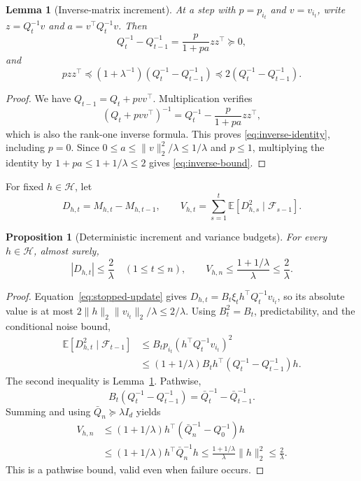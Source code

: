 \documentclass[11pt,a4paper]{article}
\numberwithin{equation}{section}
\newtheorem{lemma}[theorem]{Lemma}
\newtheorem{proposition}[theorem]{Proposition}
\theoremstyle{remark}
\newcommand{\E}{\mathbb E}
\newcommand{\F}{\mathcal F}
\newcommand{\HH}{\mathcal H}
\begin{document}
\begin{lemma}[Inverse-matrix increment]
\label{lem:inverse}
At a step with $p=p_{i_t}$ and $v=v_{i_t}$, write
$z=Q_t^{-1}v$ and $a=v^\top Q_t^{-1}v$. Then
\begin{equation}\label{eq:inverse-identity}
 Q_t^{-1}-Q_{t-1}^{-1}=\frac{p}{1+pa}zz^\top\succeq0,
\end{equation}
and
\begin{equation}\label{eq:inverse-bound}
 pzz^\top\preceq(1+\lambda^{-1})
       (Q_t^{-1}-Q_{t-1}^{-1})
 \preceq2(Q_t^{-1}-Q_{t-1}^{-1}).
\end{equation}
\end{lemma}
\begin{proof}
We have $Q_{t-1}=Q_t+pvv^\top$. Multiplication verifies
\[
 (Q_t+pvv^\top)^{-1}
 =Q_t^{-1}-\frac{p}{1+pa}zz^\top,
\]
which is also the rank-one inverse formula. This proves
\eqref{eq:inverse-identity}, including $p=0$. Since
$0\le a\le\|v\|_2^2/\lambda\le1/\lambda$ and $p\le1$, multiplying
the identity by $1+pa\le1+1/\lambda\le2$ gives
\eqref{eq:inverse-bound}.
\end{proof}

For fixed $h\in\HH$, let
\begin{equation}\label{eq:scalar-variance}
 D_{h,t}=M_{h,t}-M_{h,t-1},\qquad
 V_{h,t}=\sum_{s=1}^t\E[D_{h,s}^2\mid\F_{s-1}].
\end{equation}

\begin{proposition}[Deterministic increment and variance budgets]
\label{prop:variance}
For every $h\in\HH$, almost surely,
\begin{equation}\label{eq:variance-budget}
 |D_{h,t}|\le\frac2\lambda\quad(1\le t\le n),\qquad
 V_{h,n}\le\frac{1+1/\lambda}{\lambda}\le\frac2\lambda.
\end{equation}
\end{proposition}
\begin{proof}
Equation~\eqref{eq:stopped-update} gives
$D_{h,t}=B_t\xi_t h^\top Q_t^{-1}v_{i_t}$, so its absolute value is at
most $2\|h\|_2\|v_{i_t}\|_2/\lambda\le2/\lambda$.
Using $B_t^2=B_t$, predictability, and the conditional noise bound,
\begin{align*}
 \E[D_{h,t}^2\mid\F_{t-1}]
 &\le B_t p_{i_t}(h^\top Q_t^{-1}v_{i_t})^2\\
 &\le(1+1/\lambda)B_t
       h^\top(Q_t^{-1}-Q_{t-1}^{-1})h.
\end{align*}
The second inequality is Lemma~\ref{lem:inverse}. Pathwise,
\[
 B_t(Q_t^{-1}-Q_{t-1}^{-1})
 =\bar Q_t^{-1}-\bar Q_{t-1}^{-1}.
\]
Summing and using $\bar Q_n\succeq\lambda I_d$ yields
\begin{align*}
 V_{h,n}
 &\le(1+1/\lambda)h^\top(\bar Q_n^{-1}-Q_0^{-1})h\\
 &\le(1+1/\lambda)h^\top\bar Q_n^{-1}h
 \le\frac{1+1/\lambda}{\lambda}\|h\|_2^2
 \le\frac2\lambda.
\end{align*}
This is a pathwise bound, valid even when failure occurs.
\end{proof}
\end{document}
